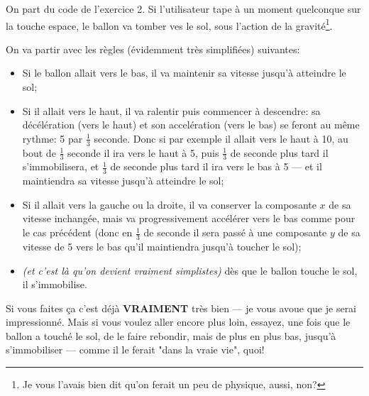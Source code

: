 \documentclass[11pt]{article}
\begin{document}
	\begin{MonExo}
		On part du code de l'exercice 2. Si l'utilisateur tape à un moment quelconque sur la touche espace, le ballon va tomber ves le sol, sous l'action de la gravité\footnote{Je vous l'avais bien dit qu'on ferait un peu de physique, aussi, non?}.
		
		On va partir avec les règles (évidemment très simplifiées) suivantes:
		\begin{itemize}
			\item Si le ballon allait vers le bas, il va maintenir sa vitesse jusqu'à atteindre le sol;
			\item Si il allait vers le haut, il va ralentir puis commencer à descendre: sa décélération (vers le haut) et son accelération (vers le bas) se feront au même rythme: 5 par $\frac{1}{3}$ seconde. Donc si par exemple il allait vers le haut à 10, au bout de $\frac{1}{3}$ seconde il ira vers le haut à 5, puis $\frac{1}{3}$ de seconde plus tard il s'immobilisera, et $\frac{1}{3}$ de seconde plus tard il ira vers le bas à 5 --- et il maintiendra sa vitesse jusqu'à atteindre le sol;
			\item Si il allait vers la gauche ou la droite, il va conserver la composante $x$ de sa vitesse inchangée, mais va progressivement accélérer vers le bas comme pour le cas précédent (donc en $\frac{1}{3}$ de seconde il sera passé à une composante $y$ de sa vitesse de 5 vers le bas qu'il maintiendra jusqu'à toucher le sol);
			\item \textit{(et c'est là qu'on devient vraiment simplistes)} dès que le ballon touche le sol, il s'immobilise.
		\end{itemize}
		
		Si vous faites ça c'est déjà \textbf{VRAIMENT} très bien --- je vous avoue que je serai impressionné. Mais si vous voulez aller encore plus loin, essayez, une fois que le ballon a touché le sol, de le faire rebondir, mais de plus en plus bas, jusqu'à s'immobiliser --- comme il le ferait "dans la vraie vie", quoi!
	\end{MonExo}

	
\end{document}
